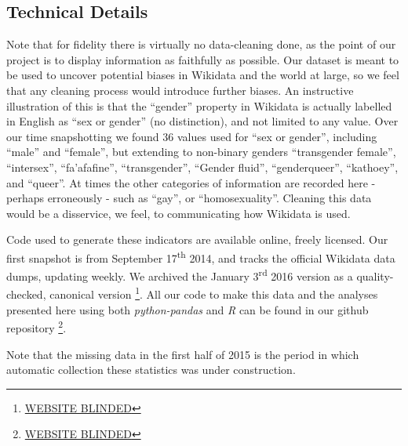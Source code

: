 \documentclass{sig-alternate-05-2015}
\begin{document}
\subsection{Technical Details}

Note that for fidelity there is virtually no data-cleaning done, as the point of our project is to display information as faithfully as possible. Our dataset is meant to be used to uncover potential biases in Wikidata and the world at large, so we feel that any cleaning process would introduce further biases. An instructive illustration of this is that the ``gender'' property in Wikidata is actually labelled in English  as ``sex or gender'' (no distinction), and not limited to any value. Over our time snapshotting we found 36 values used for ``sex or gender'', including ``male'' and ``female'', but extending to non-binary genders ``transgender female'', ``intersex'', ``fa'afafine'', ``transgender'', ``Gender fluid'',  ``genderqueer'', ``kathoey'', and ``queer''. At times the other categories of information are recorded here - perhaps erroneously - such as ``gay'', or ``homosexuality''. Cleaning this data would be a disservice, we feel, to communicating how Wikidata is used.


Code used to generate these indicators are available online, freely licensed. Our first snapshot is from September 17\textsuperscript{th} 2014, and tracks the official  Wikidata data dumps, updating weekly. We archived the January 3\textsuperscript{rd} 2016 version as a quality-checked, canonical version \footnote{\url{WEBSITE BLINDED}}. All our code to make this data and the analyses presented here using both \textit{python-pandas} and \textit{R} can be found in our github repository \footnote{\url{WEBSITE BLINDED}}.

Note that the missing data in the first half of 2015 is the period in which automatic collection these statistics was under construction.
\end{document}
